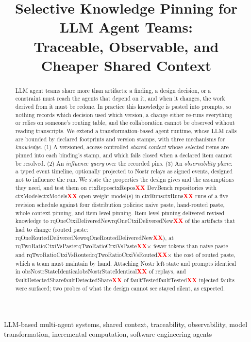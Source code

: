 \documentclass[10pt,conference]{IEEEtran}
\theoremstyle{definition}
\newcommand{\R}[1]{\ifcsname #1\endcsname\csname #1\endcsname\else\textcolor{red}{\textbf{XX}}\fi}
\begin{document}
\title{Selective Knowledge Pinning for LLM Agent Teams:\\
Traceable, Observable, and Cheaper Shared Context}


\maketitle

\begin{abstract}
LLM agent teams share more than artifacts: a finding, a design decision, or a constraint must reach
the agents that depend on it, and when it changes, the work derived from it must be redone. In
practice this knowledge is pasted into prompts, so nothing records which decision used which
version, a change either re-runs everything or relies on someone's routing table, and the
collaboration cannot be observed without reading transcripts. We extend a transformation-based
agent runtime, whose LLM calls are bounded by declared footprints and version stamps, with three
mechanisms for \emph{knowledge}. (1) A versioned, access-controlled \emph{shared context} whose
\emph{selected} items are pinned into each binding's stamp, and which fails closed when a declared item
cannot be resolved. (2) An \emph{influence query} over the recorded pins. (3) An \emph{observability
plane}: a typed event timeline, optionally projected to Nostr relays as signed events, designed not to
influence the run. We state the properties
the design gives and the assumptions they need, and test them on \R{ctxRepos} DevBench
repositories with \R{ctxModels} open-weight model(s) in \R{ctxRuns} runs of a five-revision schedule
against four distribution policies: naive paste, hand-routed paste, whole-context pinning, and
item-level pinning. Item-level pinning delivered revised knowledge to \R{rqOneCtxiDeliveredNew} of
the artifacts that had to change (routed paste: \R{rqOneRoutedDeliveredNew}), at
\R{rqTwoRatioCtxiVsPaste}$\times$ fewer tokens than naive paste and \R{rqTwoRatioCtxiVsRouted}$\times$
the cost of routed paste, which a team must maintain by hand. Attaching Nostr left state and prompts
identical in \R{obsNostrStateIdentical} of replays, and \R{faultDetectedShare} of \R{faultTested}
injected faults were surfaced; two probes of what the design cannot see stayed silent, as expected.
\end{abstract}

\begin{IEEEkeywords}
LLM-based multi-agent systems, shared context, traceability, observability, model transformation,
incremental computation, software engineering agents
\end{IEEEkeywords}
\end{document}
